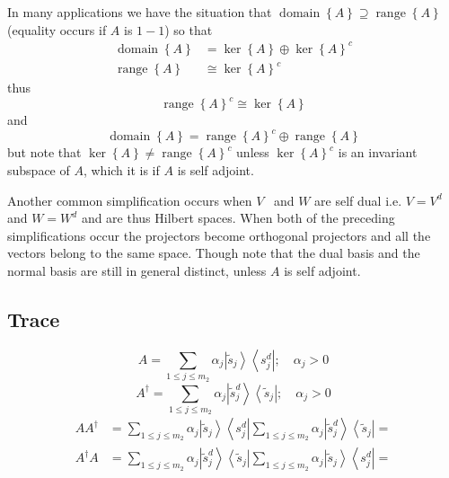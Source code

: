 \documentclass[aps,preprint]{revtex4}%
\begin{document}
In many applications we have the situation that $\operatorname{domain}\left\{
A\right\}  \supseteq\operatorname{range}\left\{  A\right\}  $ (equality occurs
if $A$ is $1-1$) so that
\begin{align}
\operatorname{domain}\left\{  A\right\}   & =\ker\left\{  A\right\}
\oplus\ker\left\{  A\right\}  ^{c}\nonumber\\
\operatorname{range}\left\{  A\right\}   & \cong\ker\left\{  A\right\}  ^{c}%
\end{align}
thus
\begin{equation}
\operatorname{range}\left\{  A\right\}  ^{c}\cong\ker\left\{  A\right\}
\end{equation}
and
\begin{equation}
\operatorname{domain}\left\{  A\right\}  =\operatorname{range}\left\{
A\right\}  ^{c}\oplus\operatorname{range}\left\{  A\right\}
\end{equation}
but note that $\ker\left\{  A\right\}  \neq\operatorname{range}\left\{
A\right\}  ^{c}$ unless $\ker\left\{  A\right\}  ^{c}$ is an invariant
subspace of $A$, which it is if $A$ is self adjoint.

Another common simplification occurs when $V$ \ and $W$ are self dual i.e.
$V=V^{d}$ and $W=W^{d}$ and are thus Hilbert spaces. When both of the
preceding simplifications occur the projectors become orthogonal projectors
and all the vectors belong to the same space. Though note that the dual basis
and the normal basis are still in general distinct, unless $A$ is self adjoint.

\subsection{Trace }%

\begin{equation}
A=\sum_{1\leq j\leq m_{2}}\alpha_{j}\left\vert \tilde{s}_{j}\right\rangle
\left\langle s_{j}^{d}\right\vert ;\quad\alpha_{j}>0
\end{equation}%
\begin{equation}
A^{\dagger}=\sum_{1\leq j\leq m_{2}}\alpha_{j}\left\vert \tilde{s}_{j}%
^{d}\right\rangle \left\langle \tilde{s}_{j}\right\vert ;\quad\alpha_{j}>0
\end{equation}%
\begin{align*}
AA^{\dagger}  & =\sum_{1\leq j\leq m_{2}}\alpha_{j}\left\vert \tilde{s}%
_{j}\right\rangle \left\langle s_{j}^{d}\right\vert \sum_{1\leq j\leq m_{2}%
}\alpha_{j}\left\vert \tilde{s}_{j}^{d}\right\rangle \left\langle \tilde
{s}_{j}\right\vert =\\
A^{\dagger}A  & =\sum_{1\leq j\leq m_{2}}\alpha_{j}\left\vert \tilde{s}%
_{j}^{d}\right\rangle \left\langle \tilde{s}_{j}\right\vert \sum_{1\leq j\leq
m_{2}}\alpha_{j}\left\vert \tilde{s}_{j}\right\rangle \left\langle s_{j}%
^{d}\right\vert =
\end{align*}
\end{document}
